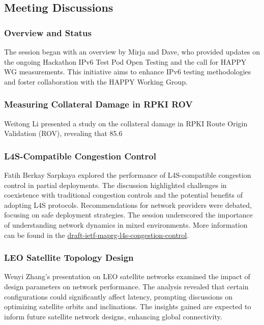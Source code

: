 \documentclass{article}
\begin{document}
\subsection{Meeting Discussions}

\subsubsection{Overview and Status}
The session began with an overview by Mirja and Dave, who provided updates on the ongoing Hackathon IPv6 Test Pod Open Testing and the call for HAPPY WG measurements. This initiative aims to enhance IPv6 testing methodologies and foster collaboration with the HAPPY Working Group.

\subsubsection{Measuring Collateral Damage in RPKI ROV}
Weitong Li presented a study on the collateral damage in RPKI Route Origin Validation (ROV), revealing that 85.6%

\subsubsection{L4S-Compatible Congestion Control}
Fatih Berkay Sarpkaya explored the performance of L4S-compatible congestion control in partial deployments. The discussion highlighted challenges in coexistence with traditional congestion controls and the potential benefits of adopting L4S protocols. Recommendations for network providers were debated, focusing on safe deployment strategies. The session underscored the importance of understanding network dynamics in mixed environments. More information can be found in the \href{https://datatracker.ietf.org/doc/html/draft-ietf-maprg-l4s-congestion-control}{draft-ietf-maprg-l4s-congestion-control}.

\subsubsection{LEO Satellite Topology Design}
Wenyi Zhang's presentation on LEO satellite networks examined the impact of design parameters on network performance. The analysis revealed that certain configurations could significantly affect latency, prompting discussions on optimizing satellite orbits and inclinations. The insights gained are expected to inform future satellite network designs, enhancing global connectivity.
\end{document}

